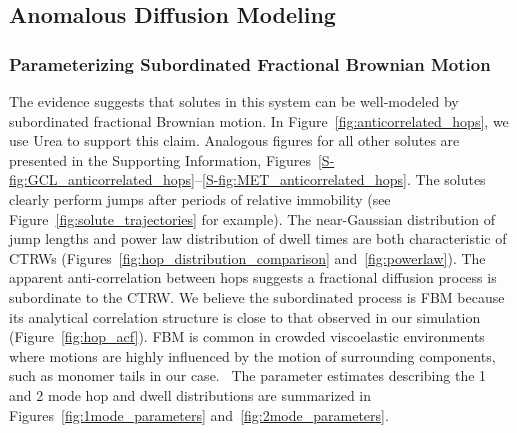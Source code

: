 \documentclass{article}
\begin{document}
%  
%    
  
  \subsection{Anomalous Diffusion Modeling}\label{section:sFBM}
  
  \subsubsection{Parameterizing Subordinated Fractional Brownian Motion}\label{section:AD_parameterization}

  The evidence suggests that solutes in this system can be well-modeled by subordinated
  fractional Brownian motion. In Figure~\ref{fig:anticorrelated_hops}, we use Urea to
  support this claim. Analogous figures for all other solutes are presented in the Supporting
  Information, Figures~\ref{S-fig:GCL_anticorrelated_hops}--\ref{S-fig:MET_anticorrelated_hops}.
  The solutes clearly perform jumps after periods of relative
  immobility (see Figure~\ref{fig:solute_trajectories} for example). The near-Gaussian distribution
  of jump lengths and power law distribution of dwell times are both characteristic of 
  CTRWs (Figures~\ref{fig:hop_distribution_comparison} and~\ref{fig:powerlaw}). The apparent
  anti-correlation between hops suggests a fractional diffusion process is subordinate to the
  CTRW. We believe the subordinated process is FBM because its analytical correlation 
  structure is close to that observed in our simulation (Figure~\ref{fig:hop_acf}). FBM
  is common in crowded viscoelastic environments where motions are highly influenced by
  the motion of surrounding components, such as monomer tails in our case.~\cite{ernst_fractional_2012}
  The parameter estimates describing the 1 and 2 mode hop and dwell distributions are 
  summarized in Figures~\ref{fig:1mode_parameters} and~\ref{fig:2mode_parameters}.
  
\end{document}
